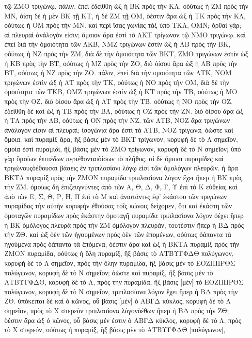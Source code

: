 \begin{Parallel}{}{}
{{τῷ ΖΜΟ τριγώνῳ. πάλιν, ἐπεὶ ἐδείθθη ὡξ ἡ ΒΚ πρὸς τὴν ΚΛ,
οὁύτως ἡ ΖΜ πρὸς τὴν ΜΝ, ὸίση δὲ ἡ μὲν ΒΚ τῇ ΚΤ, ἡ δὲ ΖΜ τῇ
ΟΜ, ὸέστιν ἄρα ὡξ ἡ ΤΚ πρὸς τὴν ΚΛ, οὁύτως ἡ ΟΜ πρὸς τὴν ΜΝ. καὶ
περὶ  ἴσας γωνίας τὰξ ὑπὸ ΤΚΛ, ΟΜΝ; ὀρθαὶ γάρ; αἱ πλευραὶ ἀνάλογόν
εἰσιν; ὅμοιον ἄρα ἐστὶ τὸ ΛΚΤ τρίγωνον τῷ ΝΜΟ τριγώνῳ. καὶ
ἐπεὶ διὰ τὴν ὁμοιότητα τῶν ΛΚΒ, ΝΜΖ τριγώνων ἐστὶν ὡξ ἡ ΛΒ
πρὸς τὴν ΒΚ, οὁύτως ἡ ΝΖ πρὸς τὴν ΖΜ, διὰ δὲ τὴν ὁμοιότητα τῶν 
ΒΚΤ,
ΖΜΟ τριγώνων ἐστὶν ὡξ ἡ ΚΒ πρὸς τὴν ΒΤ, οὁύτως ἡ ΜΖ πρὸς τὴν ΖΟ,
διὸ ὸίσου ἄρα ὡξ ἡ ΛΒ πρὸς τὴν ΒΤ, οὁύτως ἡ ΝΖ πρὸς τὴν ΖΟ. πάλιν,
ἐπεὶ διὰ τὴν ομοιότητα τῶν ΛΤΚ, ΝΟΜ τριγώνων ἐστὶν ὡξ ἡ ΛΤ πρὸς
τὴν ΤΚ, οὁύτως ἡ ΝΟ πρὸς τὴν ΟΜ, διὰ δὲ τὴν ὁμοιότητα τῶν ΤΚΒ, ΟΜΖ
τριγώνων ἐστὶν ὡξ ἡ ΚΤ πρὸς τὴν ΤΒ, οὁύτως ἡ ΜΟ πρὸς τὴν ΟΖ, διὸ
ὸίσου ἄρα ὡξ ἡ ΛΤ πρὸς τὴν ΤΒ, οὁύτως ἡ ΝΟ πρὸς τὴν ΟΖ. ἐδείθθη
δὲ καὶ ὡξ ἡ ΤΒ πρὸς τὴν ΒΛ, οὁύτως ἡ ΟΖ πρὸς τὴν ΖΝ. διὸ ὸίσου ἄρα ὡξ ἡ ΤΛ πρὸς τὴν ΛΒ, οὁύτως ἡ ΟΝ πρὸς τὴν ΝΖ. τῶν ΛΤΒ, ΝΟΖ ἄρα τριγώνων ἀνάλογόν εἰσιν αἱ πλευραί; ἰσογώνια ἄρα ἐστὶ τὰ ΛΤΒ, ΝΟΖ
τρίγωνα; ὁώστε καὶ ὅμοια. καὶ πυραμὶξ ἄρα, ἣξ βάσις μὲν τὸ ΒΚΤ τρίγωνον,
κορυφὴ δὲ τὸ Λ σημεῖον, ὁμοία ἐστὶ πυραμίδι, ἣξ βάσις μὲν τὸ ΖΜΟ
τρίγωνον, κορυφὴ δὲ τὸ Ν σημεῖον; ὑπὸ γὰρ ὅμοίων ἐπιπέδων περιέθονταιὸίσων τὸ πλῆθος. αἱ δὲ ὅμοιαι πυραμίδες καὶ τριγώνουςὸέθουσαι βάσεις
ἐν τριπλασίονι λόγῳ εἰσὶ τῶν ὁμολόγων πλευρῶν. ἡ  ἄρα ΒΚΤΛ πυραμὶξ
πρὸς τὴν ΖΜΟΝ πυραμίδα τριπλασίονα λόγον ἔχει ἢπερ ἡ ΒΚ πρὸς 
τὴν ΖΜ.
ὁμοίως δὴ ἐπιζευγνύντες ἀπὸ τῶν Α, Θ, Δ, Φ, Γ, Υ ἐπὶ τὸ Κ εὐθείας
καὶ ἀπὸ  τῶν Ε, Σ, Θ, Ρ, Η, Π ἐπὶ τὸ Μ καὶ ἀνιστάντες ἐφ' ἑκάστου
τῶν τριγώνων πυραμίδας τὴν αὐτὴν κορυφὴν ἐθούσας τοῖς κώνοις
δείχομεν, ὅτι καὶ ἑκάστη τῶν ὁμοταγῶν πυραμίδων πρὸς ἑκάστην ὁμοταγῆ
πυραμίδα τριπλασίονα λόγον ὁέχει ἢπερ ἡ ΒΚ ὁμόλογος πλευρὰ πρὸς τὴν ΖΜ
ὁμόλογον πλευράν, τουτέστιν ἢπερ ἡ ΒΔ πρὸς τὴν ΖΘ. καὶ ὡξ ὁὲν τῶν
ἡγουμένων πρὸς ὁὲν τῶν ἑπομένων, οὁύτως ὁάπαντα τὰ ἡγούμενα
πρὸς ὁάπαντα τὰ ἑπόμενα; ὸέστιν ἄρα καὶ ὡξ ἡ ΒΚΤΛ πυραμὶξ πρὸς
τὴν ΖΜΟΝ πυραμίδα, οὁύτως ἡ ὅλη πυραμίξ, ἣξ βάσις τὸ ΑΤΒΥΓΦΔΘ πολύγωνον,
κορυφὴ δὲ τὸ Λ σημεῖον, πρὸς τὴν ὅλην πυραμίδα, ἣξ βάσις μὲν τὸ ΕΟΖΠΗΡΘΣ πολύγωνον,
κορυφὴ δὲ τὸ Ν σημεῖον; ὁώστε καὶ πυραμίξ, ἣξ βάσις μὲν τὸ ΑΤΒΥΓΦΔΘ, κορυφὴ
δὲ τὸ Λ, πρὸς τὴν πυραμίδα, ἣξ βάσις [μὲν] τὸ ΕΟΖΠΗΡΘΣ πολύγωνον, κορυφὴ
δὲ τὸ Ν σημεῖον, τριπλασίονα λόγον ἔχει ἢπερ ἡ ΒΔ πρὸς τὴν ΖΘ. ὑπόκειται δὲ καὶ
ὁ κῶνος, οὗ βάσις [μὲν]
ὁ ΑΒΓΔ κύκλος, κορυφὴ δὲ τὸ Λ σημεῖον, πρὸς τὸ Χ στερεὸν τριπλασίονα λόγονὸέθων ἢπερ ἡ ΒΔ πρὸς τὴν ΖΘ;  ὸέστιν ἄρα ὡξ ὁ κῶνος, οὗ βάσις μέν ἐστιν ὁ ΑΒΓΔ κύκλος,
κορυφὴ δὲ τὸ Λ, πρὸς τὸ Χ στερεόν, οὁύτως ἡ πυραμίξ, ἣξ βάσις μὲν τὸ ΑΤΒΥΓΦΔΘ [πολύγωνον],
}}
\end{Parallel}

